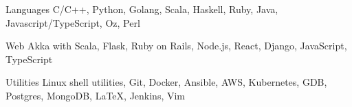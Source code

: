 

\begin{cvskills}


  \cvskill
  {Languages}
  {C/C++, Python, Golang, Scala, Haskell, Ruby, Java, Javascript/TypeScript, Oz, Perl}


  \cvskill
  {Web}
  {Akka with Scala, Flask, Ruby on Rails, Node.js, React, Django, JavaScript, TypeScript}


  \cvskill
  {Utilities}
  {Linux shell utilities, Git, Docker, Ansible, AWS, Kubernetes, GDB, Postgres, MongoDB, \LaTeX, Jenkins, Vim}




\end{cvskills}
